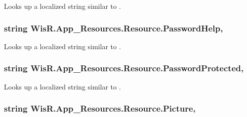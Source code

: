 Looks up a localized string similar to . 

\hypertarget{class_wis_r_1_1_app___resources_1_1_resource_a8baf6c99971b155c1034c799596ab233}{}
\subsubsection[{Password\+Help}]{\setlength{\rightskip}{0pt plus 5cm}string Wis\+R.\+App\+\_\+\+Resources.\+Resource.\+Password\+Help\hspace{0.3cm}{\ttfamily [static]}, {\ttfamily [get]}}\label{class_wis_r_1_1_app___resources_1_1_resource_a8baf6c99971b155c1034c799596ab233}


Looks up a localized string similar to . 

\hypertarget{class_wis_r_1_1_app___resources_1_1_resource_aa1491c80789d2e46e8ac42c1bca6b46f}{}
\subsubsection[{Password\+Protected}]{\setlength{\rightskip}{0pt plus 5cm}string Wis\+R.\+App\+\_\+\+Resources.\+Resource.\+Password\+Protected\hspace{0.3cm}{\ttfamily [static]}, {\ttfamily [get]}}\label{class_wis_r_1_1_app___resources_1_1_resource_aa1491c80789d2e46e8ac42c1bca6b46f}


Looks up a localized string similar to . 

\hypertarget{class_wis_r_1_1_app___resources_1_1_resource_a5844dd582db1d6a0c9eebcb37383a0c7}{}
\subsubsection[{Picture}]{\setlength{\rightskip}{0pt plus 5cm}string Wis\+R.\+App\+\_\+\+Resources.\+Resource.\+Picture\hspace{0.3cm}{\ttfamily [static]}, {\ttfamily [get]}}\label{class_wis_r_1_1_app___resources_1_1_resource_a5844dd582db1d6a0c9eebcb37383a0c7}


